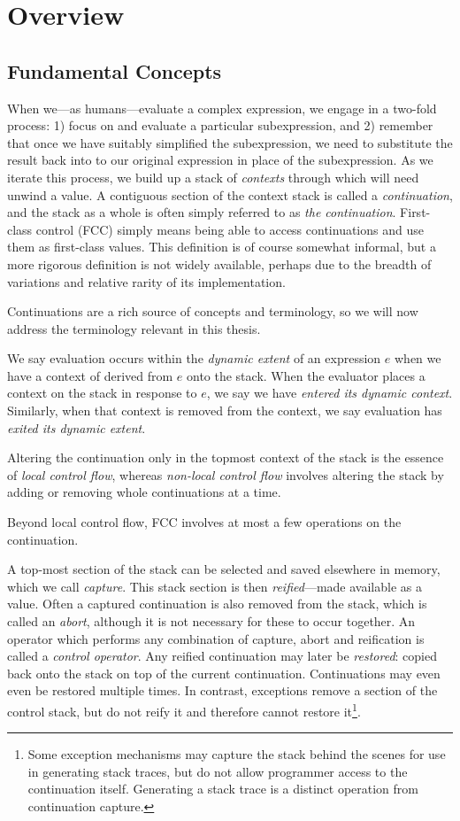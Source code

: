 \documentclass[11pt]{article}
\newcommand{\maybePage}{\newpage}
\begin{document}
\maybePage
\section{Overview}

\subsection{Fundamental Concepts}
When we---as humans---evaluate a complex expression, we engage in a two-fold process: 1) focus on and evaluate a particular subexpression, and 2) remember that once we have suitably simplified the subexpression, we need to substitute the result back into to our original expression in place of the subexpression.
As we iterate this process, we build up a stack of \emph{contexts} through which will need unwind a value.
A contiguous section of the context stack is called a \emph{continuation}, and the stack as a whole is often simply referred to as \emph{the continuation}.
First-class control (FCC) simply means being able to access continuations and use them as first-class values.
This definition is of course somewhat informal, but a more rigorous definition is not widely available, perhaps due to the breadth of variations and relative rarity of its implementation.

Continuations are a rich source of concepts and terminology, so we will now address the terminology relevant in this thesis.

We say evaluation occurs within the \emph{dynamic extent} of an expression $e$ when we have a context of derived from $e$ onto the stack.
When the evaluator places a context on the stack in response to $e$, we say we have \emph{entered its dynamic context}.
Similarly, when that context is removed from the context, we say evaluation has \emph{exited its dynamic extent}.

Altering the continuation only in the topmost context of the stack is the essence of \emph{local control flow}, whereas \emph{non-local control flow} involves altering the stack by adding or removing whole continuations at a time.

Beyond local control flow, FCC involves at most a few operations on the continuation.

A top-most section of the stack can be selected and saved elsewhere in memory, which we call \emph{capture}.
This stack section is then \emph{reified}---made available as a value.
Often a captured continuation is also removed from the stack, which is called an \emph{abort}, although it is not necessary for these to occur together.
An operator which performs any combination of capture, abort and reification is called a \emph{control operator}.
Any reified continuation may later be \emph{restored}: copied back onto the stack on top of the current continuation.
Continuations may even even be restored multiple times.
In contrast, exceptions remove a section of the control stack, but do not reify it and therefore cannot restore it\footnote{Some exception mechanisms may capture the stack behind the scenes for use in generating stack traces, but do not allow programmer access to the continuation itself. Generating a stack trace is a distinct operation from continuation capture.}.
\end{document}
